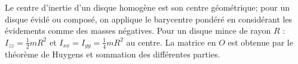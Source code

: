 \begin{corrigebox}
Le centre d'inertie d'un disque homogène est son centre géométrique;
                pour un disque évidé ou composé, on applique le barycentre pondéré en
                considérant les évidements comme des masses négatives.
Pour un disque mince de rayon $R$ :
                $I_{zz}=\tfrac12mR^2$ et $I_{xx}=I_{yy}=\tfrac14mR^2$ au centre.
                La matrice en $O$ est obtenue par le théorème de Huygens et sommation des
                différentes parties.
\end{corrigebox}

